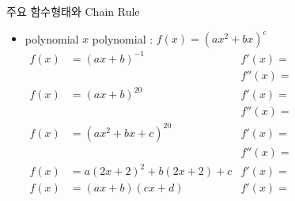 \documentclass[aspectratio=169]{beamer}
\begin{document}
\begin{frame}{주요 함수형태와 Chain Rule}
  \begin{itemize}
    \item polynomial $ x $ polynomial : $ f(x) = (ax^2 + bx)^{c} $
        \begin{align*}
          f(x) & = (ax + b)^{-1}            & f'(x)= \hspace{5cm} \\
                                           && f''(x) = \hspace{5cm} \\
          f(x) & = (ax + b)^{20}            & f'(x)= \hspace{5cm} \\
                                           && f''(x) = \hspace{5cm} \\
          f(x) & = (ax^2 + bx + c)^{20}     & f'(x)= \hspace{5cm} \\
                                           && f''(x) = \hspace{5cm} \\
          f(x) & = a(2x+2)^2 + b(2x+2) + c  & f'(x)= \hspace{5cm} \\[1em]
          f(x) & = (ax+b)(cx+d)             & f'(x)= \hspace{5cm} 
        \end{align*}
  \end{itemize}
  
\end{frame}
\end{document}
